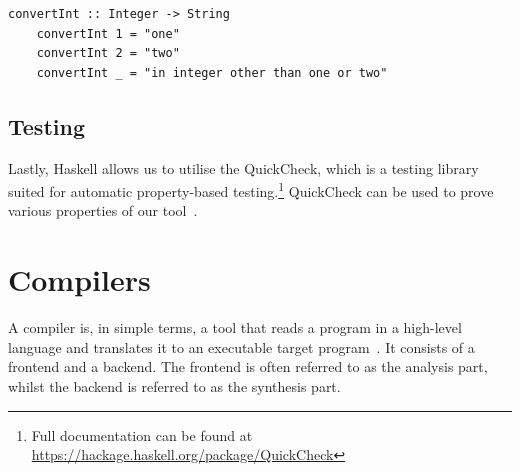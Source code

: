 \begin{lstlisting}[caption={A simple Haskell function converting values of type Integer to its string equivalent}, captionpos=b]
    convertInt :: Integer -> String
    convertInt 1 = "one"
    convertInt 2 = "two"
    convertInt _ = "in integer other than one or two"
\end{lstlisting}

\subsection{Testing}

Lastly, Haskell allows us to utilise the QuickCheck, which is a testing library suited for automatic property-based testing.\footnote{Full documentation can be found at \url{https://hackage.haskell.org/package/QuickCheck}} QuickCheck can be used to prove various properties of our tool~\cite{DBLP:conf/icfp/ClaessenH00}.

\section{Compilers}

A compiler is, in simple terms, a tool that reads a program in a high-level language and translates it to an executable target program~\cite{DBLP:books/aw/AhoSU86}. It consists of a frontend and a backend. The frontend is often referred to as the analysis part, whilst the backend is referred to as the synthesis part. \hfill \\

